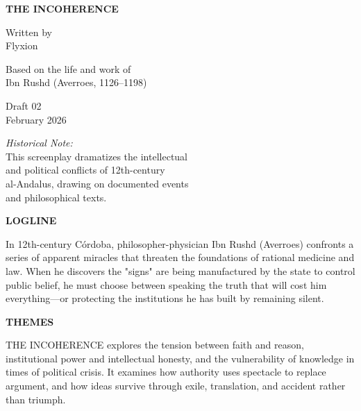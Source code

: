 \documentclass[12pt]{article}
\newcommand{\filmtitle}[1]{%
  \begin{center}
  \MakeUppercase{\textbf{#1}}
  \end{center}
}
\newcommand{\sectionhead}[1]{%
  \needspace{3\baselineskip}%
  \vspace{2em}%
  \noindent\textbf{#1}%
  \vspace{0.5em}%
}
\newcommand{\action}[1]{%
  \noindent#1\par\vspace{0.75em}%
}
\begin{document}
\thispagestyle{empty}
\vspace*{3in}

\filmtitle{The Incoherence}

\begin{center}
\vspace{2em}
Written by\\
Flyxion

\vspace{1.5em}
Based on the life and work of\\
Ibn Rushd (Averroes, 1126--1198)

\vspace{3em}
Draft 02\\
February 2026
\end{center}

\vfill


\clearpage
\setcounter{page}{1}

\begin{flushleft}
\textit{Historical Note:}\\
This screenplay dramatizes the intellectual\\
and political conflicts of 12th-century\\
al-Andalus, drawing on documented events\\
and philosophical texts.
\end{flushleft}

\sectionhead{LOGLINE}

\action{In 12th-century Córdoba, philosopher-physician Ibn Rushd (Averroes) confronts a series of apparent miracles that threaten the foundations of rational medicine and law. When he discovers the "signs" are being manufactured by the state to control public belief, he must choose between speaking the truth that will cost him everything—or protecting the institutions he has built by remaining silent.}

\vspace{1em}

\sectionhead{THEMES}

\action{THE INCOHERENCE explores the tension between faith and reason, institutional power and intellectual honesty, and the vulnerability of knowledge in times of political crisis. It examines how authority uses spectacle to replace argument, and how ideas survive through exile, translation, and accident rather than triumph.}

\clearpage

\end{document}
